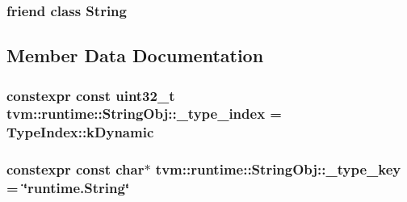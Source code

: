 \subsubsection[{\texorpdfstring{String}{String}}]{\setlength{\rightskip}{0pt plus 5cm}friend class {\bf String}\hspace{0.3cm}{\ttfamily [friend]}}\hypertarget{classtvm_1_1runtime_1_1StringObj_a7fb804f7dc96dd9f705c84095f37f1ca}{}\label{classtvm_1_1runtime_1_1StringObj_a7fb804f7dc96dd9f705c84095f37f1ca}


\subsection{Member Data Documentation}
\subsubsection[{\texorpdfstring{\+\_\+type\+\_\+index}{_type_index}}]{\setlength{\rightskip}{0pt plus 5cm}constexpr const uint32\+\_\+t tvm\+::runtime\+::\+String\+Obj\+::\+\_\+type\+\_\+index = Type\+Index\+::k\+Dynamic\hspace{0.3cm}{\ttfamily [static]}}\hypertarget{classtvm_1_1runtime_1_1StringObj_a9d0bb5c54d59456980767be2398dbc16}{}\label{classtvm_1_1runtime_1_1StringObj_a9d0bb5c54d59456980767be2398dbc16}
\subsubsection[{\texorpdfstring{\+\_\+type\+\_\+key}{_type_key}}]{\setlength{\rightskip}{0pt plus 5cm}constexpr const char$\ast$ tvm\+::runtime\+::\+String\+Obj\+::\+\_\+type\+\_\+key = \char`\"{}runtime.\+String\char`\"{}\hspace{0.3cm}{\ttfamily [static]}}\hypertarget{classtvm_1_1runtime_1_1StringObj_a4b4433ded5abdaae4ac417cee103f8d2}{}\label{classtvm_1_1runtime_1_1StringObj_a4b4433ded5abdaae4ac417cee103f8d2}
